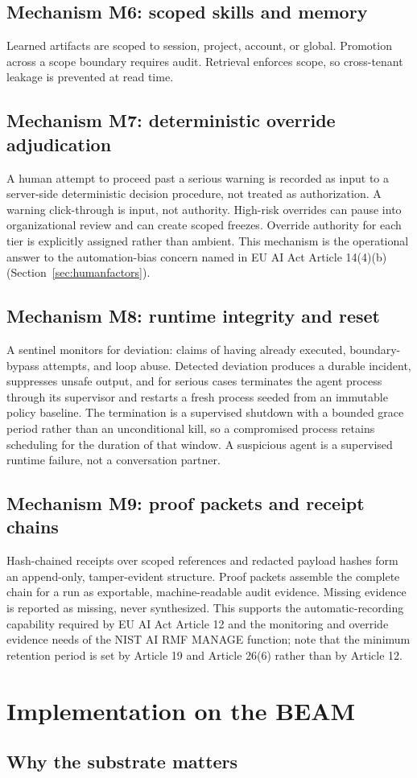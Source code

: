 \documentclass[11pt,letterpaper]{article}
\newcommand{\mech}[2]{\subsection{Mechanism #1: #2}\label{mech:#1}}
\begin{document}
\mech{M6}{scoped skills and memory}
Learned artifacts are scoped to session, project, account, or global. Promotion across a scope boundary requires audit. Retrieval enforces scope, so cross-tenant leakage is prevented at read time.

\mech{M7}{deterministic override adjudication}
A human attempt to proceed past a serious warning is recorded as input to a server-side deterministic decision procedure, not treated as authorization. A warning click-through is input, not authority. High-risk overrides can pause into organizational review and can create scoped freezes. Override authority for each tier is explicitly assigned rather than ambient. This mechanism is the operational answer to the automation-bias concern named in EU AI Act Article 14(4)(b) (Section~\ref{sec:humanfactors}).

\mech{M8}{runtime integrity and reset}
A sentinel monitors for deviation: claims of having already executed, boundary-bypass attempts, and loop abuse. Detected deviation produces a durable incident, suppresses unsafe output, and for serious cases terminates the agent process through its supervisor and restarts a fresh process seeded from an immutable policy baseline. The termination is a supervised shutdown with a bounded grace period rather than an unconditional kill, so a compromised process retains scheduling for the duration of that window. A suspicious agent is a supervised runtime failure, not a conversation partner.

\mech{M9}{proof packets and receipt chains}
Hash-chained receipts over scoped references and redacted payload hashes form an append-only, tamper-evident structure. Proof packets assemble the complete chain for a run as exportable, machine-readable audit evidence. Missing evidence is reported as missing, never synthesized. This supports the automatic-recording capability required by EU AI Act Article 12 and the monitoring and override evidence needs of the NIST AI RMF MANAGE function; note that the minimum retention period is set by Article 19 and Article 26(6) rather than by Article 12.

\section{Implementation on the BEAM}\label{sec:beam}

\subsection{Why the substrate matters}\label{sec:beam-why}
\end{document}
